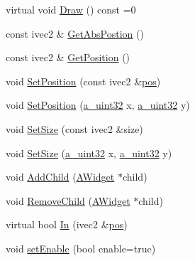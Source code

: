 \begin{DoxyCompactItemize}
\item 
virtual void \hyperlink{class_agmd_1_1_a_widget_a310017991d4562418b3b4a1523778373}{Draw} () const =0
\item 
const ivec2 \& \hyperlink{class_agmd_1_1_a_widget_aab1c4fdeb55ed6d6695ca221199da5db}{Get\+Abs\+Postion} ()
\item 
const ivec2 \& \hyperlink{class_agmd_1_1_a_widget_abb92e4a1b58191f19a3cf70e0a997034}{Get\+Position} ()
\item 
void \hyperlink{class_agmd_1_1_a_widget_ad623409b81ce39302f804b81fc6f0c5b}{Set\+Position} (const ivec2 \&\hyperlink{_examples_2_planet_2_app_8cpp_aa8a1c0491559faca4ebd0881575ae7f0}{pos})
\item 
void \hyperlink{class_agmd_1_1_a_widget_abc9afe855a9e356d8b22b4959b4501d4}{Set\+Position} (\hyperlink{_common_defines_8h_a964296f9770051b9e4807b1f180dd416}{a\+\_\+uint32} x, \hyperlink{_common_defines_8h_a964296f9770051b9e4807b1f180dd416}{a\+\_\+uint32} y)
\item 
void \hyperlink{class_agmd_1_1_a_widget_a607875daab03a397bc8c56e0b9a7b05d}{Set\+Size} (const ivec2 \&size)
\item 
void \hyperlink{class_agmd_1_1_a_widget_a7599bd3aed06c6a87a6366dca1180157}{Set\+Size} (\hyperlink{_common_defines_8h_a964296f9770051b9e4807b1f180dd416}{a\+\_\+uint32} x, \hyperlink{_common_defines_8h_a964296f9770051b9e4807b1f180dd416}{a\+\_\+uint32} y)
\item 
void \hyperlink{class_agmd_1_1_a_widget_a558d87b5f1a21cd024f64ae5614eaa5b}{Add\+Child} (\hyperlink{class_agmd_1_1_a_widget}{A\+Widget} $\ast$child)
\item 
void \hyperlink{class_agmd_1_1_a_widget_afcdc701a93e19e28fdd2bb8eaf247f3f}{Remove\+Child} (\hyperlink{class_agmd_1_1_a_widget}{A\+Widget} $\ast$child)
\item 
virtual bool \hyperlink{class_agmd_1_1_a_widget_a277347e1b69a4b0bf9b533712839c175}{In} (ivec2 \&\hyperlink{_examples_2_planet_2_app_8cpp_aa8a1c0491559faca4ebd0881575ae7f0}{pos})
\item 
void \hyperlink{class_agmd_1_1_a_widget_a553dae5fc9aa4acb0f8a030514bcc539}{set\+Enable} (bool enable=true)
\end{DoxyCompactItemize}

